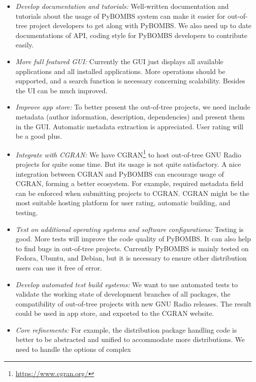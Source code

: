 \documentclass[a4paper]{article}
\begin{document}
\begin{itemize}
  \item \emph{Develop documentation and tutorials:} Well-written
    documentation and tutorials about the usage of PyBOMBS system
    can make it easier for out-of-tree
    project developers to get along with PyBOMBS.
    We also need up to date documentations of API, coding style for
    PyBOMBS developers to contribute easily.
  \item \emph{More full featured GUI:} Currently the GUI just displays
    all available applications and all installed applications.
    More operations should be supported, and a search function is
    necessary concerning scalability. Besides the UI can be much
    improved.
  \item \emph{Improve app store:} To better present the out-of-tree
    projects, we need include metadata (author information, description,
    dependencies) and present them in the GUI. Automatic metadata
    extraction is appreciated. User rating will be a good plus.
  \item \emph{Integrate with CGRAN:} We have CGRAN\footnote{%
    \url{https://www.cgran.org/}} to host out-of-tree
    GNU Radio projects for quite some time. But its usage is not quite
    satisfactory. A nice integration between CGRAN and PyBOMBS can
    encourage usage of CGRAN, forming a better ecosystem. For example,
    required metadata field can be enforced when submitting projects to
    CGRAN. CGRAN might be the most suitable hosting platform for user
    rating, automatic building, and testing.
  \item \emph{Test on additional operating systems and software
    configurations:} Testing is good. More tests will improve the code quality of
    PyBOMBS\@. It can also help to find bugs in out-of-tree projects.
    Currently PyBOMBS is mainly tested on Fedora, Ubuntu, and Debian,
    but it is necessary to ensure other distribution users can use it
    free of error.
  \item \emph{Develop automated test build systems:} We want to use
    automated tests to validate the working state of development
    branches of all packages, the compatibility of out-of-tree projects
    with new GNU Radio releases. The result
    could be used in app store, and exported to the CGRAN website.
  \item \emph{Core refinements:} For example, the distribution package
    handling code is better to be abstracted and unified to accommodate
    more distributions. We need to handle the options of complex

\end{itemize}
\end{document}
